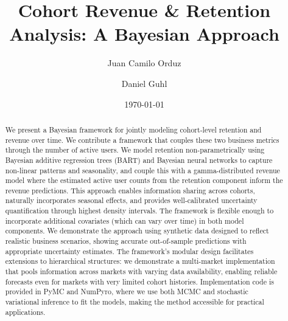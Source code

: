 \documentclass[11pt]{amsart}
\theoremstyle{definition}
\begin{document}
\title{Cohort Revenue \& Retention Analysis: A Bayesian Approach}

\author{Juan Camilo Orduz}
\address{Berlin, Germany}

\author{Daniel Guhl}
\address{Humboldt-Universit\"{a}t zu Berlin, Germany}

\date{\today}

\begin{abstract}
    We present a Bayesian framework for jointly modeling cohort-level retention and revenue over time. We contribute a
    framework that couples these two business metrics through the number of active users. We model retention non-parametrically using
    Bayesian additive regression trees (BART) and Bayesian neural networks to capture non-linear patterns and seasonality, and couple
    this with a gamma-distributed revenue model where the estimated active user counts from the retention component inform
    the revenue predictions. This approach enables information sharing across cohorts, naturally incorporates seasonal effects,
    and provides well-calibrated uncertainty quantification through highest density intervals. The framework is flexible enough
    to incorporate additional covariates (which can vary over time) in both model components. We demonstrate the approach using synthetic
    data designed to reflect realistic business scenarios, showing accurate out-of-sample predictions with appropriate
    uncertainty estimates. The framework's modular design facilitates extensions to hierarchical structures: we demonstrate
    a multi-market implementation that pools information across markets with varying data availability, enabling reliable
    forecasts even for markets with very limited cohort histories. Implementation code is provided in PyMC and NumPyro, where
    we use both MCMC and stochastic variational inference to fit the models, making the method accessible for practical applications.
\end{abstract}

\maketitle

\tableofcontents

\end{document}
